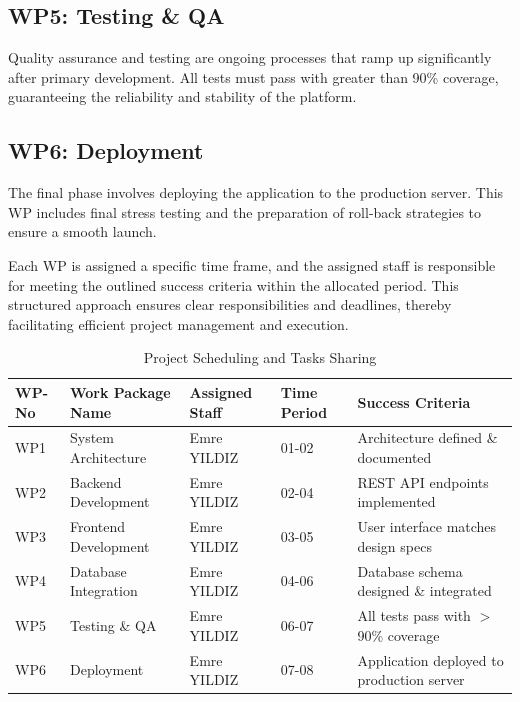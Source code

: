 \documentclass[12pt]{report}
\begin{document}
\subsection{WP5: Testing \& QA}
Quality assurance and testing are ongoing processes that ramp up significantly after primary development. All tests must pass with greater than 90\% coverage, guaranteeing the reliability and stability of the platform.

\subsection{WP6: Deployment}
The final phase involves deploying the application to the production server. This WP includes final stress testing and the preparation of roll-back strategies to ensure a smooth launch.

Each WP is assigned a specific time frame, and the assigned staff is responsible for meeting the outlined success criteria within the allocated period. This structured approach ensures clear responsibilities and deadlines, thereby facilitating efficient project management and execution.

\begin{table}[h]
\centering
\begin{tabular}{|l|l|l|p{2cm}|p{4cm}|}
\hline
\textbf{WP-No} & \textbf{Work Package Name} & \textbf{Assigned Staff} & \textbf{Time Period} & \textbf{Success Criteria} \\ \hline
WP1            & System Architecture        & Emre YILDIZ             & 01-02                & Architecture defined \& documented \\ \hline
WP2            & Backend Development        & Emre YILDIZ             & 02-04                & REST API endpoints implemented \\ \hline
WP3            & Frontend Development       & Emre YILDIZ             & 03-05                & User interface matches design specs \\ \hline
WP4            & Database Integration       & Emre YILDIZ             & 04-06                & Database schema designed \& integrated \\ \hline
WP5            & Testing \& QA              & Emre YILDIZ             & 06-07                & All tests pass with $>$ 90\% coverage \\ \hline
WP6            & Deployment                 & Emre YILDIZ             & 07-08                & Application deployed to production server \\ \hline
\end{tabular}
\caption{Project Scheduling and Tasks Sharing}
\label{table:project_schedule}
\end{table}
\end{document}
